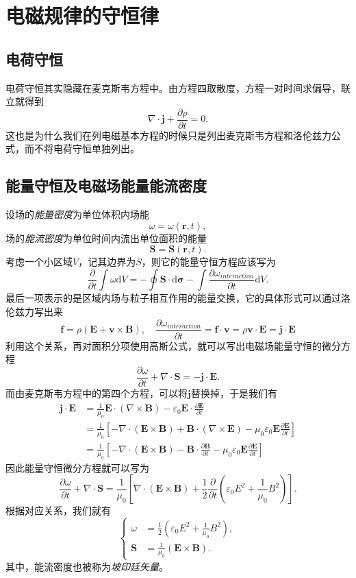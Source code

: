 \documentclass[UTF8]{ctexbook}
\renewcommand{\d}{\mathrm{d}}
\renewcommand{\b}{\boldsymbol}
\numberwithin{equation}{chapter}
\begin{document}
	\section{电磁规律的守恒律}
	\subsection{电荷守恒}
	电荷守恒其实隐藏在麦克斯韦方程中。由方程四取散度，方程一对时间求偏导，联立就得到
	\[\nabla\cdot\b{j}+\frac{\partial \rho}{\partial t}=0.\]
	这也是为什么我们在列电磁基本方程的时候只是列出麦克斯韦方程和洛伦兹力公式，而不将电荷守恒单独列出。
	
	\subsection{能量守恒及电磁场能量能流密度}
	设场的\emph{能量密度}为单位体积内场能
	\[\omega=\omega(\b{r},t),\]
	场的\emph{能流密度}为单位时间内流出单位面积的能量
	\[\b{S}=\b{S}(\b{r},t).\]
	考虑一个小区域$V$，记其边界为$S$，则它的能量守恒方程应该写为
	\[\frac{\partial }{\partial t}\int \omega \d V=-\oint \b{S}\cdot\d\b{\sigma}-\int \frac{\partial \omega_{interaction}}{\partial t}\d V.\]
	最后一项表示的是区域内场与粒子相互作用的能量交换，它的具体形式可以通过洛伦兹力写出来
	\[\b{f}=\rho(\b{E}+\b{v}\times\b{B}),\quad \frac{\partial \omega_{interaction}}{\partial t}=\b{f}\cdot\b{v}=\rho\b{v}\cdot\b{E}=\b{j}\cdot\b{E}\]
	利用这个关系，再对面积分项使用高斯公式，就可以写出电磁场能量守恒的微分方程
	\[\frac{\partial \omega}{\partial t}+\nabla\cdot\b{S}=-\b{j}\cdot\b{E}.\]
	而由麦克斯韦方程中的第四个方程，可以将$\b{j}$替换掉，于是我们有
	\begin{align*}
		\b{j}\cdot\b{E}&=\frac{1}{\mu_0}\b{E}\cdot(\nabla\times\b{B})-\varepsilon_0\b{E}\cdot\frac{\partial \b{E}}{\partial t} \\
		&=\frac{1}{\mu_0}\left[-\nabla\cdot(\b{E}\times\b{B})+\b{B}\cdot(\nabla\times\b{E})-\mu_0\varepsilon_0\b{E}\frac{\partial \b{E}}{\partial t}\right] \\
		&=\frac{1}{\mu_0}\left[-\nabla\cdot(\b{E}\times\b{B})-\b{B}\cdot\frac{\partial \b{B}}{\partial t}-\mu_0\varepsilon_0\b{E}\frac{\partial \b{E}}{\partial t}\right] 
	\end{align*}
	因此能量守恒微分方程就可以写为
	\[\frac{\partial \omega}{\partial t}+\nabla\cdot\b{S}=\frac{1}{\mu_0}\left[\nabla\cdot(\b{E}\times\b{B})+\frac{1}{2}\frac{\partial }{\partial t}\left(\varepsilon_0 E^2+\frac{1}{\mu_0}B^2\right)\right].\]
	根据对应关系，我们就有
	\[\left\{\begin{aligned}
		\omega&=\frac{1}{2}(\varepsilon_0E^2+\frac{1}{\mu_0}B^2), \\
		\b{S}&=\frac{1}{\mu_0}(\b{E}\times\b{B}).
	\end{aligned}\right.\]
	其中，能流密度也被称为\emph{坡印廷矢量}。
	
\end{document}

